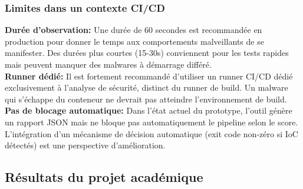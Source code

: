 \subsubsection{Limites dans un contexte CI/CD}
\textbf{Durée d'observation: } Une durée de 60 secondes est recommandée en production pour donner le temps aux comportements malveillants de se manifester. Des durées plus courtes (15-30s) conviennent pour les tests rapides mais peuvent manquer des malwares à démarrage différé. \\

\noindent \textbf{Runner dédié: } Il est fortement recommandé d'utiliser un runner CI/CD dédié exclusivement à l'analyse de sécurité, distinct du runner de build. Un malware qui s'échappe du conteneur ne devrait pas atteindre l'environnement de build. \\

\noindent \textbf{Pas de blocage automatique: } Dans l'état actuel du prototype, l'outil génère un rapport JSON mais ne bloque pas automatiquement le pipeline selon le score. L'intégration d'un mécanisme de décision automatique (exit code non-zéro si IoC détectés) est une perspective d'amélioration.

\subsection{Résultats du projet académique}
